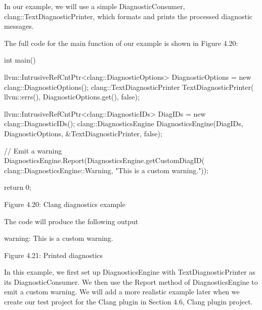 In our example, we will use a simple DiagnosticConsumer, clang::TextDiagnosticPrinter, which formats and prints the processed diagnostic messages.

The full code for the main function of our example is shown in Figure 4.20:

\begin{cpp}
int main() {
  llvm::IntrusiveRefCntPtr<clang::DiagnosticOptions> DiagnosticOptions =
    new clang::DiagnosticOptions();
  clang::TextDiagnosticPrinter TextDiagnosticPrinter(
    llvm::errs(), DiagnosticOptions.get(), false);

  llvm::IntrusiveRefCntPtr<clang::DiagnosticIDs> DiagIDs =
    new clang::DiagnosticIDs();
  clang::DiagnosticsEngine DiagnosticsEngine(DiagIDs, DiagnosticOptions,
                                             &TextDiagnosticPrinter, false);

  // Emit a warning
  DiagnosticsEngine.Report(DiagnosticsEngine.getCustomDiagID(
    clang::DiagnosticsEngine::Warning, "This is a custom warning."));

  return 0;
}
\end{cpp}

\begin{center}
Figure 4.20: Clang diagnostics example
\end{center}

The code will produce the following output

\begin{shell}
warning: This is a custom warning.
\end{shell}

\begin{center}
Figure 4.21: Printed diagnostics
\end{center}

In this example, we first set up DiagnosticsEngine with TextDiagnosticPrinter as its DiagnosticConsumer. We then use the Report method of DiagnosticsEngine to emit a custom warning. We will add a more realistic example later when we create our test project for the Clang plugin in Section 4.6, Clang plugin project.

























































